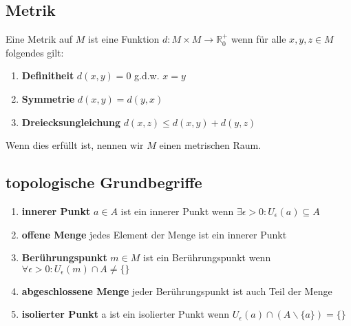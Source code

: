
\subsection{Metrik}
Eine Metrik auf $M$ ist eine Funktion $d:M\times M \rightarrow \mathbb{R}_0^+$ wenn für alle $x,y,z \in M$ folgendes gilt:
\begin{enumerate}
    \item \textbf{Definitheit} $d(x,y) = 0$ g.d.w. $x=y$
    \item \textbf{Symmetrie} $d(x,y) = d(y,x)$
    \item \textbf{Dreiecksungleichung} $d(x,z) \leq d(x,y) + d(y,z)$
\end{enumerate}
Wenn dies erfüllt ist, nennen wir $M$ einen metrischen Raum.

\subsection{topologische Grundbegriffe}
\begin{enumerate}
    \item \textbf{innerer Punkt} $a\in A$ ist ein innerer Punkt wenn $\exists \epsilon >0: U_{\epsilon}(a) \subseteq A$
    \item \textbf{offene Menge} jedes Element der Menge ist ein innerer Punkt
    \item \textbf{Berührungspunkt} $m\in M$ ist ein Berührungspunkt wenn $\forall \epsilon >0: U_\epsilon (m) \cap A \neq \{\} $ 
    \item \textbf{abgeschlossene Menge} jeder Berührungspunkt ist auch Teil der Menge
    \item \textbf{isolierter Punkt} a ist ein isolierter Punkt wenn $U_\epsilon (a) \cap (A\backslash \{a\})= \{\}$
\end{enumerate}